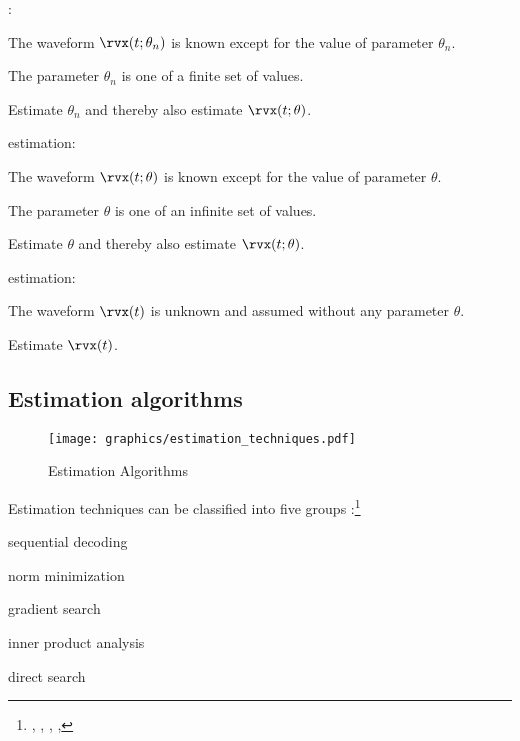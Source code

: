 \begin{enume}
   \item {}:
      \begin{liste}
         \item The waveform $\rvx(t;\theta_n)$ is known except for the value of parameter $\theta_n$.
         \item The parameter $\theta_n$ is one of a finite set of values.
         \item Estimate $\theta_n$ and thereby also estimate $\rvx(t;\theta)$.
      \end{liste}
   \item {} estimation:
      \begin{liste}
         \item The waveform $\rvx(t;\theta)$ is known except for the value of parameter $\theta$.
         \item The parameter $\theta$ is one of an infinite set of values.
         \item Estimate $\theta$ and thereby also estimate $\rvx(t;\theta)$.
      \end{liste}
   \item {} estimation:
      \begin{liste}
         \item The waveform $\rvx(t)$ is unknown and assumed without any parameter $\theta$.
         \item Estimate $\rvx(t)$.
      \end{liste}
\end{enume}


\subsection{Estimation algorithms}
\label{ref:sec:parameter-est}
\begin{figure}
\centering%
\texttt{[image: graphics/estimation\_techniques.pdf]}
\caption{Estimation Algorithms\label{fig:est-tech}}
\end{figure}
Estimation techniques can be classified into
five groups :\footnote{%
  ,
  ,
  ,
  ,
  }
\begin{enume}
   \item sequential decoding
   \item norm minimization
   \item gradient search
   \item inner product analysis
   \item direct search
\end{enume}


